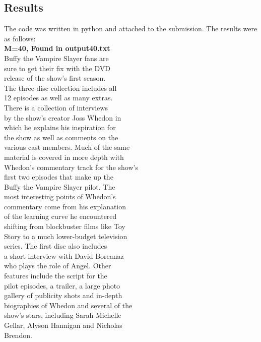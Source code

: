 \documentclass[11pt]{article}
\begin{document}
\subsection*{Results}
The code was written in python and attached to the submission. The results were as follows:\\

\textbf{M=40, Found in output40.txt}\\
Buffy the Vampire Slayer fans are \\
sure to get their fix with the DVD \\
release of the show's first season. \\
The three-disc collection includes all \\
12 episodes as well as many extras. \\
There is a collection of interviews \\
by the show's creator Joss Whedon in \\
which he explains his inspiration for \\
the show as well as comments on the \\
various cast members. Much of the same \\
material is covered in more depth with \\
Whedon's commentary track for the show's \\
first two episodes that make up the \\
Buffy the Vampire Slayer pilot. The \\
most interesting points of Whedon's \\
commentary come from his explanation \\
of the learning curve he encountered \\
shifting from blockbuster films like Toy \\
Story to a much lower-budget television \\
series. The first disc also includes \\
a short interview with David Boreanaz \\
who plays the role of Angel. Other \\
features include the script for the \\
pilot episodes, a trailer, a large photo \\
gallery of publicity shots and in-depth \\
biographies of Whedon and several of the \\
show's stars, including Sarah Michelle \\
Gellar, Alyson Hannigan and Nicholas \\
Brendon. \\
\end{document}
